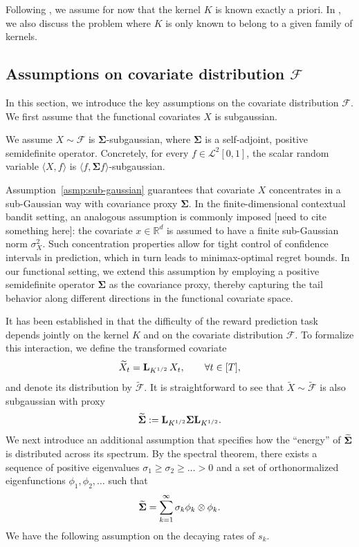 \documentclass[mnsc]{informs3aa} %
\newcommand{\betaa}{\beta^{(a)}}
\newcommand{\tildebetaa}{\tilde\beta^{(a)}}
\newcommand{\LKernel}{\bL_{K^{1/2}}}
\newcommand{\norm}[1]{\left\|#1\right\|}
\renewcommand{\tilde}{\widetilde}
\newcommand{\bSigma}{\bold{\Sigma}}
\newcommand{\bL}{\bold L}
\newcommand{\mF}{\mathcal F}
\newcommand{\mL}{\mathcal L}
\renewcommand{\tilde}{\widetilde}
\renewcommand{\tilde}{\widetilde}
\begin{document}
Following \cite{cai2012minimax}, we assume for now that the kernel $K$ is known exactly a priori. In , we also discuss the problem where $K$ is only known to belong to a given family of kernels. 




\subsection{Assumptions on covariate distribution $\mF$}\label{subsec: context_assumptions}
In this section, we introduce the key assumptions on the covariate distribution $\mathcal{F}$. We first assume that the functional covariates $X$ is subgaussian.
\begin{assumption}\label{asmp:sub-gaussian}
	We assume $X\sim \mF$ is $\boldsymbol\Sigma$-subgaussian, where $\boldsymbol\Sigma$ is a self-adjoint, positive semidefinite operator. Concretely, for every $f \in \mL^2[0,1]$, the scalar random variable $\langle X, f \rangle$ is 	\(\langle f, \boldsymbol\Sigma f \rangle\)-subgaussian.
	
\end{assumption}
Assumption~\ref{asmp:sub-gaussian} guarantees that covariate $X$ concentrates in a sub-Gaussian way with covariance proxy \(\boldsymbol\Sigma\).
In the finite-dimensional contextual bandit setting, an analogous assumption is commonly imposed [need to cite something here]: the covariate $x \in \mathbb{R}^d$ is assumed to have a finite sub-Gaussian norm $\sigma_X^2$. Such concentration properties allow for tight control of confidence intervals in prediction, which in turn leads to minimax-optimal regret bounds. In our functional setting, we extend this assumption by employing a positive semidefinite operator $\boldsymbol\Sigma$ as the covariance proxy, thereby capturing the tail behavior along different directions in the functional covariate space. 

It has been established in \cite{cai2012minimax} that the difficulty of the reward prediction task depends jointly on the kernel $K$ and on the covariate distribution $\mathcal{F}$. To formalize this interaction, we define the transformed covariate
\[
\tilde{X}_t = \bL_{K^{1/2}}\,X_t,\qquad \forall t\in[T],
\]
and denote its distribution by $\tilde{\mathcal{F}}$.  It is straightforward to see that $\tilde X\sim\tilde{\mF}$ is also subgaussian with proxy
\[\tilde{\bSigma} := \bL_{K^{1/2}}\bSigma\bL_{K^{1/2}}.\]
We next introduce an additional assumption that specifies how the ``energy'' of $\tilde{\bSigma}$ is distributed across its spectrum. By the spectral theorem, there exists a sequence of positive eigenvalues $\sigma_1\geq \sigma_2\ge \ldots > 0$ and a set of orthonormalized eigenfunctions $\phi_1,\phi_2,\ldots$ such that
\[\tilde{\bSigma}= \sum_{k=1}^{\infty}\sigma_k \phi_k\otimes\phi_k.\]
We have the following assumption on the decaying rates of $s_k.$
\end{document}
